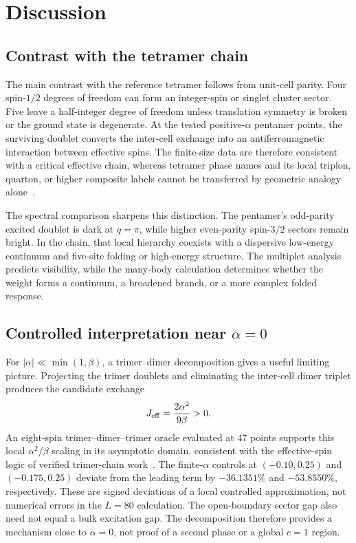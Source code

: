 \section{Discussion}
\label{sec:discussion}

\subsection{Contrast with the tetramer chain}

The main contrast with the reference tetramer follows from unit-cell parity.
Four spin-$1/2$ degrees of freedom can form an integer-spin or singlet cluster sector.
Five leave a half-integer degree of freedom unless translation symmetry is broken or the ground state is degenerate.
At the tested positive-$\alpha$ pentamer points, the surviving doublet converts the inter-cell exchange into an antiferromagnetic interaction between effective spins.
The finite-size data are therefore consistent with a critical effective chain, whereas tetramer phase names and its local triplon, quarton, or higher composite labels cannot be transferred by geometric analogy alone~\cite{li2026tetramer_verified}.

The spectral comparison sharpens this distinction.
The pentamer's odd-parity excited doublet is dark at $q=\pi$, while higher even-parity spin-$3/2$ sectors remain bright.
In the chain, that local hierarchy coexists with a dispersive low-energy continuum and five-site folding or high-energy structure.
The multiplet analysis predicts visibility, while the many-body calculation determines whether the weight forms a continuum, a broadened branch, or a more complex folded response.

\subsection{Controlled interpretation near \texorpdfstring{$\alpha=0$}{alpha=0}}

For $|\alpha|\ll\min(1,\beta)$, a trimer--dimer decomposition gives a useful limiting picture.
Projecting the trimer doublets and eliminating the inter-cell dimer triplet produces the candidate exchange
\begin{equation}
J_{\mathrm{eff}}=\frac{2\alpha^2}{9\beta}>0.
\label{eq:near-zero}
\end{equation}
An eight-spin trimer--dimer--trimer oracle evaluated at 47 points supports this local $\alpha^2/\beta$ scaling in its asymptotic domain, consistent with the effective-spin logic of verified trimer-chain work~\cite{cheng2022trimer}.
The finite-$\alpha$ controls at $(-0.10,0.25)$ and $(-0.175,0.25)$ deviate from the leading term by $-36.1351\%$ and $-53.8550\%$, respectively.
These are signed deviations of a local controlled approximation, not numerical errors in the $L=80$ calculation.
The open-boundary sector gap also need not equal a bulk excitation gap.
The decomposition therefore provides a mechanism close to $\alpha=0$, not proof of a second phase or a global $c=1$ region.


